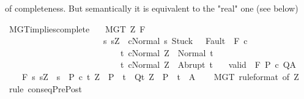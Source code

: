 \begin{isabellebody}
\begin{isamarkuptext}
        of completeness. But semantically it is equivalent to the "real" one
        (see below)%
\end{isamarkuptext}\isamarkuptrue%
\isamarkupfalse%
\ MGT{\isacharunderscore}implies{\isacharunderscore}complete{\isacharprime}{\isacharcolon}\isanewline
\ \ \ MGT{\isacharcolon}\ {\isachardoublequoteopen}{\isasymforall}Z{\isachardot}\ {\isasymGamma}{\isacharcomma}{\isacharbraceleft}{\isacharbraceright}{\isasymturnstile}\isactrlbsub {\isacharslash}F\isactrlesub \ \isanewline
\ \ \ \ \ \ \ \ \ \ \ \ \ \ \ \ \ \ \ \ \ \ \ {\isacharbraceleft}s{\isachardot}\ s{\isacharequal}Z\ {\isasymand}\ {\isasymGamma}{\isasymturnstile}{\isasymlangle}c{\isacharcomma}Normal\ s{\isasymrangle}\ {\isasymRightarrow}{\isasymnotin}{\isacharparenleft}{\isacharbraceleft}Stuck{\isacharbraceright}\ {\isasymunion}\ \ Fault\ {\isacharbackquote}\ {\isacharparenleft}{\isacharminus}F{\isacharparenright}{\isacharparenright}{\isacharbraceright}\ c\ \isanewline
\ \ \ \ \ \ \ \ \ \ \ \ \ \ \ \ \ \ \ \ \ \ \ \ \ \ \ {\isacharbraceleft}t{\isachardot}\ {\isasymGamma}{\isasymturnstile}{\isasymlangle}c{\isacharcomma}Normal\ Z{\isasymrangle}\ {\isasymRightarrow}\ Normal\ t{\isacharbraceright}{\isacharcomma}\isanewline
\ \ \ \ \ \ \ \ \ \ \ \ \ \ \ \ \ \ \ \ \ \ \ \ \ \ \ {\isacharbraceleft}t{\isachardot}\ {\isasymGamma}{\isasymturnstile}{\isasymlangle}c{\isacharcomma}Normal\ Z{\isasymrangle}\ {\isasymRightarrow}\ Abrupt\ t{\isacharbraceright}{\isachardoublequoteclose}\isanewline
\ \ \ valid{\isacharcolon}\ {\isachardoublequoteopen}{\isasymGamma}\ {\isasymTurnstile}\isactrlbsub {\isacharslash}F\isactrlesub \ P\ c\ Q{\isacharcomma}A{\isachardoublequoteclose}\ \isanewline
\ \ \ {\isachardoublequoteopen}{\isasymGamma}{\isacharcomma}{\isacharbraceleft}{\isacharbraceright}\ {\isasymturnstile}\isactrlbsub {\isacharslash}F\isactrlesub \ {\isacharbraceleft}s{\isachardot}\ s{\isacharequal}Z\ {\isasymand}\ s\ {\isasymin}\ P{\isacharbraceright}\ c\ {\isacharbraceleft}t{\isachardot}\ Z\ {\isasymin}\ P\ {\isasymlongrightarrow}\ t\ {\isasymin}\ Q{\isacharbraceright}{\isacharcomma}{\isacharbraceleft}t{\isachardot}\ Z\ {\isasymin}\ P\ {\isasymlongrightarrow}\ t\ {\isasymin}\ A{\isacharbraceright}{\isachardoublequoteclose}\isanewline
%
\isadelimproof
\ \ %
\endisadelimproof
%
\isatagproof
{}\isamarkupfalse%
\ MGT\ {\isacharbrackleft}rule{\isacharunderscore}format{\isacharcomma}\ of\ Z{\isacharbrackright}\isanewline
\ \ \isamarkupfalse%
\ {\isacharparenleft}rule\ conseqPrePost{\isacharparenright}\isanewline

\end{isabellebody}

